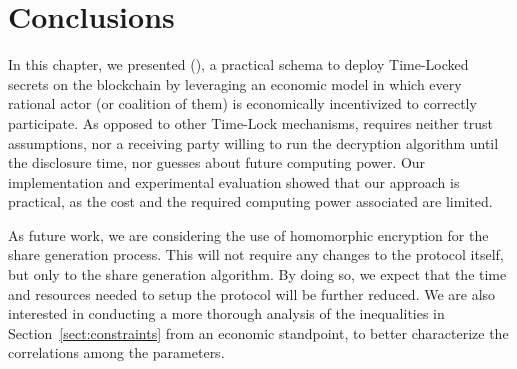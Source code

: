 \section{Conclusions}\label{sect:conclusions}

In this chapter, we presented \name (\shortname), a practical schema to deploy Time-Locked secrets on the blockchain by leveraging an economic model in which every rational actor (or coalition of them) is economically incentivized to correctly participate.
As opposed to other Time-Lock mechanisms, \shortname requires neither trust assumptions, nor a receiving party willing to run the decryption algorithm until the disclosure time, nor guesses about future computing power.
Our implementation and experimental evaluation showed that our approach is practical, as the cost and the required computing power associated are limited.

As future work, we are considering the use of homomorphic encryption for the share generation process. This will not require any changes to the protocol itself, but only to the share generation algorithm. By doing so, we expect that the time and resources needed to setup the protocol will be further reduced.
We are also interested in conducting a more thorough analysis of the inequalities in Section~\ref{sect:constraints} from an economic standpoint, to better characterize the correlations among the parameters.
